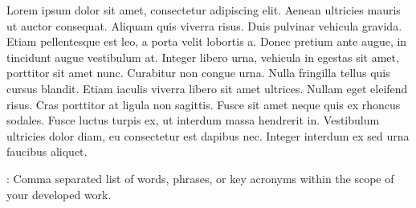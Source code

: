 \begin{secondlangabstract}

Lorem ipsum dolor sit amet, consectetur adipiscing elit. Aenean ultricies mauris ut auctor consequat. Aliquam quis viverra risus. Duis pulvinar vehicula gravida. Etiam pellentesque est leo, a porta velit lobortis a. Donec pretium ante augue, in tincidunt augue vestibulum at. Integer libero urna, vehicula in egestas sit amet, porttitor sit amet nunc. Curabitur non congue urna. Nulla fringilla tellus quis cursus blandit. Etiam iaculis viverra libero sit amet ultrices. Nullam eget eleifend risus. Cras porttitor at ligula non sagittis. Fusce sit amet neque quis ex rhoncus sodales. Fusce luctus turpis ex, ut interdum massa hendrerit in. Vestibulum ultricies dolor diam, eu consectetur est dapibus nec. Integer interdum ex sed urna faucibus aliquet.



\vspace*{10mm} 
\noindent
\textbf{\keywordslabel}: Comma separated list of words, phrases, or key acronyms within the scope of your developed work. 

\end{secondlangabstract}

